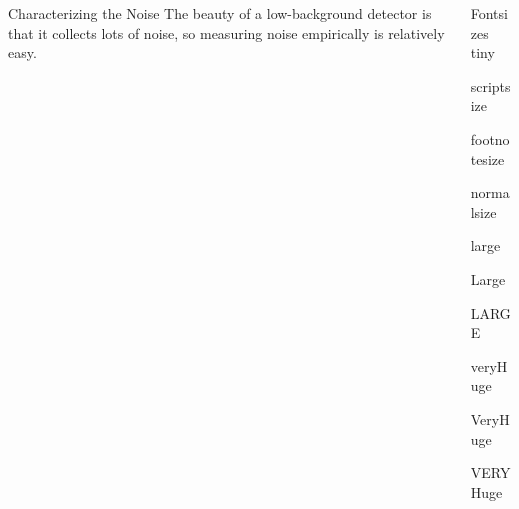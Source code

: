 \documentclass[final]{beamer} %
\begin{document}
\begin{frame}{}
\begin{columns}[t]
\begin{column}{.3\linewidth}
\begin{block}{\large Characterizing the Noise}
The beauty of a low-background detector is that it collects lots of noise, so measuring noise empirically is relatively easy.
    \end{block}

  \end{column}


  \begin{column}{.3\linewidth}

    \begin{block}{\large Fontsizes}
      \centering
      {\tiny tiny}\par
      {\scriptsize scriptsize}\par
      {\footnotesize footnotesize}\par
      {\normalsize normalsize}\par
      {\large large}\par
      {\Large Large}\par
      {\LARGE LARGE}\par
      {\veryHuge veryHuge}\par
      {\VeryHuge VeryHuge}\par
      {\VERYHuge VERYHuge}\par
    \end{block}

  \end{column}


  \end{columns}
  \end{frame}
  
\end{document}
